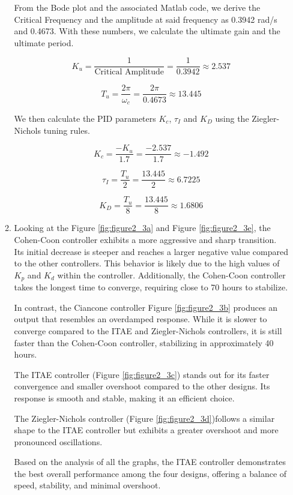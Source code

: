 \documentclass[12pt]{article}
\begin{document}
\begin{enumerate}
\begin{enumerate}
    From the Bode plot and the associated Matlab code, we derive the Critical Frequency and the amplitude at said frequency as 0.3942 rad/s and 0.4673. With these numbers, we calculate the ultimate gain and the ultimate period.

    \[
    K_u = \frac{1}{\text{Critical Amplitude}} = \frac{1}{0.3942} \approx 2.537
    \]

    \[
    T_u = \frac{2\pi}{\omega_c} = \frac{2\pi}{0.4673} \approx 13.445
    \]

    We then calculate the PID parameters $K_c$, $\tau_I$ and $K_D$ using the Ziegler-Nichols tuning rules.

    \[
    K_c = \frac{-K_u}{1.7} = \frac{-2.537}{1.7}\approx -1.492
    \]

    \[
    \tau_I = \frac{T_u}{2} = \frac{13.445}{2} \approx 6.7225
    \]

    \[
    K_D = \frac{T_u}{8} = \frac{13.445}{8} \approx 1.6806
    \]

    \item
    Looking at the Figure \ref{fig:figure2_3a} and Figure \ref{fig:figure2_3e}, the Cohen-Coon controller exhibits a more aggressive and sharp transition. Its initial decrease is steeper and reaches a larger negative value compared to the other controllers. This behavior is likely due to the high values of $K_p$ and $K_d$ within the controller. Additionally, the Cohen-Coon controller takes the longest time to converge, requiring close to 70 hours to stabilize.

    In contrast, the Ciancone controller Figure \ref{fig:figure2_3b} produces an output that resembles an overdamped response. While it is slower to converge compared to the ITAE and Ziegler-Nichols controllers, it is still faster than the Cohen-Coon controller, stabilizing in approximately 40 hours.

    The ITAE controller (Figure \ref{fig:figure2_3c}) stands out for its faster convergence and smaller overshoot compared to the other designs. Its response is smooth and stable, making it an efficient choice. 
    
    The Ziegler-Nichols controller (Figure \ref{fig:figure2_3d})follows a similar shape to the ITAE controller but exhibits a greater overshoot and more pronounced oscillations.

    Based on the analysis of all the graphs, the ITAE controller demonstrates the best overall performance among the four designs, offering a balance of speed, stability, and minimal overshoot.


\end{enumerate}
\end{enumerate}
\end{document}
